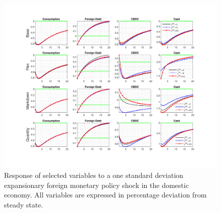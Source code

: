 \documentclass[12pt, a4paper]{article}
\begin{document}
\begin{figure}[H]
  \hspace{-0.1cm}
	\centering
	\centerline{\includegraphics[trim = 0mm 23mm 0mm 18mm, clip, scale=0.93]{foreign_liq.pdf}}
	\caption{Response of selected variables to a one standard deviation expansionary foreign monetary policy shock in the domestic economy. All variables are expressed in percentage deviation from steady state.}
	\label{foralt_liq}
\end{figure}
\end{document}
